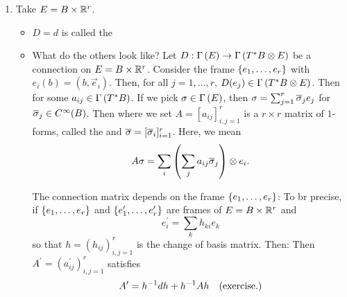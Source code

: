 \documentclass[main.tex]{subfiles}
\begin{document}
\begin{exmp}
    \begin{enumerate}
        \item Take $E = B \times \mathbb{R}^r$.
            \begin{itemize}
                \item $D = d$ is called the 
                \item What do the others look like? Let $D : \Gamma\left( E \right) \to \Gamma\left( T^*B \otimes E \right)$ be a connection on $E =B \times \mathbb{R}^r$. Consider the frame $\left\{e_1, \dots, e_r\right\}$ with $e_i(b) = (b, \vec{e}_i)$. Then, for all $j = 1,\dots, r$, $D(e_j) \in \Gamma\left( T^*B \otimes E \right)$. Then 
                 for some $a_{ij} \in \Gamma\left( T^*B \right)$. If we pick $\sigma \in \Gamma\left( E \right)$, then $\sigma = \sum_{j=1}^r \overline{\sigma}_j e_j$ for $\overline{\sigma}_j \in C^\infty(B)$. Then
                 where we set $A = [a_{ij}]_{i,j=1}^r$ is a $r \times r$ matrix of $1$-forms, called the  and $\overline{\sigma} = [\overline{\sigma}_i]_{i=1}^r$. Here, we mean
                \[
                A\sigma = \sum_i \left(  \sum_j a_{ij} \overline{\sigma}_j  \right) \otimes e_i.
                \]
                
                \begin{note}
                The connection matrix depends on the frame $\left\{e_1, \dots, e_r\right\}$: To br precise, if $\left\{e_1, \dots, e_r\right\}$ and $\left\{e_1^\prime, \dots, e_r^\prime\right\}$ are frames of $E = B \times \mathbb{R}^r$ and 
                \[
                e_i^\prime = \sum_k h_{ki} e_k
                \]
                so that $h = (h_{ij})_{i,j=1}^r$ is the change of basis matrix. Then: 
                Then $A^\prime = (a_{ij}^\prime)_{i,j=1}^r$ satisfies
                \[
                A^\prime = h^{-1}dh + h^{-1}A h \hspace{1em}\text{(exercise.)}
                \]
                \end{note}
            \end{itemize}
            

\end{enumerate}
\end{exmp}
\end{document}
